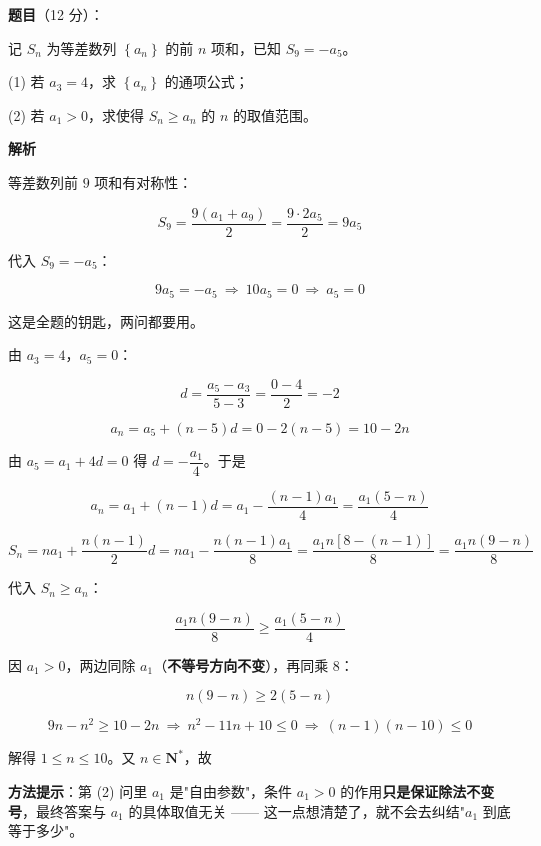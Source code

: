 \begin{answer}

\textbf{题目}（12 分）：

记 $S_n$ 为等差数列 $\left\{a_n\right\}$ 的前 $n$ 项和，已知 $S_9=-a_5$。

  (1) 若 $a_3=4$，求 $\left\{a_n\right\}$ 的通项公式；

  (2) 若 $a_1>0$，求使得 $S_n\ge a_n$ 的 $n$ 的取值范围。

\textbf{解析}


等差数列前 $9$ 项和有对称性：

\nopagebreak[4]
\[S_9=\frac{9\left(a_1+a_9\right)}2=\frac{9\cdot2a_5}2=9a_5\]

代入 $S_9=-a_5$：

\nopagebreak[4]
\[9a_5=-a_5\ \Longrightarrow\ 10a_5=0\ \Longrightarrow\ \boxed{a_5=0}\]

这是全题的钥匙，两问都要用。


由 $a_3=4$，$a_5=0$：

\nopagebreak[4]
\[d=\frac{a_5-a_3}{5-3}=\frac{0-4}2=-2\]

\nopagebreak[4]
\[a_n=a_5+(n-5)d=0-2(n-5)=10-2n\]


由 $a_5=a_1+4d=0$ 得 $d=-\dfrac{a_1}4$。于是

\nopagebreak[4]
\[a_n=a_1+(n-1)d=a_1-\frac{(n-1)a_1}4=\frac{a_1(5-n)}4\]

\nopagebreak[4]
\[S_n=na_1+\frac{n(n-1)}2d=na_1-\frac{n(n-1)a_1}8=\frac{a_1n\left[8-(n-1)\right]}8=\frac{a_1n(9-n)}8\]

代入 $S_n\ge a_n$：

\nopagebreak[4]
\[\frac{a_1n(9-n)}8\ge\frac{a_1(5-n)}4\]

因 $a_1>0$，两边同除 $a_1$（\textbf{不等号方向不变}），再同乘 $8$：

\nopagebreak[4]
\[n(9-n)\ge2(5-n)\]

\nopagebreak[4]
\[9n-n^{2}\ge10-2n\ \Longrightarrow\ n^{2}-11n+10\le0\ \Longrightarrow\ (n-1)(n-10)\le0\]

解得 $1\le n\le10$。又 $n\in\mathbf N^{*}$，故

\begin{gktip}
\textbf{方法提示}：第 (2) 问里 $a_1$ 是"自由参数"，条件 $a_1>0$ 的作用\textbf{只是保证除法不变号}，最终答案与 $a_1$ 的具体取值无关 —— 这一点想清楚了，就不会去纠结"$a_1$ 到底等于多少"。
\end{gktip}



\par\medskip

\end{answer}
